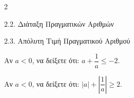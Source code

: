 \begin{ylh}{2}
    \item 2.2. Διάταξη Πραγματικών Αριθμών
    \item 2.3. Απόλυτη Τιμή Πραγματικού Αριθμού
\end{ylh}

\begin{alist}
\item Αν $a < 0$, να δείξετε ότι: $a + \dfrac{1}{a} \leq - 2$.
\item Αν $a < 0$, να δείξετε ότι: $|a| + \left| \dfrac{1}{a} \right| \geq 2$.
\end{alist}

